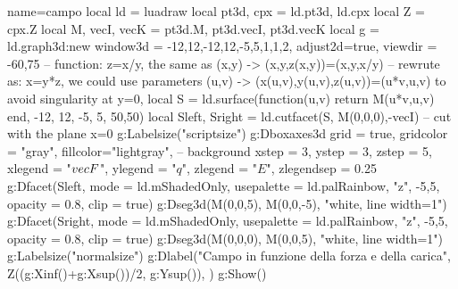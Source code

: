 \documentclass{standalone}
\begin{document}
    \begin{luadraw}{name=campo}
    local ld = luadraw
    local pt3d, cpx = ld.pt3d, ld.cpx
    local Z = cpx.Z
    local M, vecI, vecK = pt3d.M, pt3d.vecI, pt3d.vecK
    local g = ld.graph3d:new{
        window3d = {-12,12,-12,12,-5,5,1,1,2},
        adjust2d=true, viewdir = {-60,75}
    }
    -- function: z=x/y, the same as (x,y) -> (x,y,z(x,y))=(x,y,x/y) 
    -- rewrute as: x=y*z, we could use parameters (u,v) -> (x(u,v),y(u,v),z(u,v))=(u*v,u,v) to avoid singularity at y=0,
    local S = ld.surface(function(u,v) return M(u*v,u,v) end, -12, 12, -5, 5, {50,50})
    local Sleft, Sright = ld.cutfacet(S, {M(0,0,0),-vecI}) -- cut with the plane x=0
    g:Labelsize("scriptsize")
    g:Dboxaxes3d{
        grid = true, gridcolor = "gray", fillcolor="lightgray", -- background
        xstep = 3, ystep = 3, zstep = 5,
        xlegend = "$\\vec{F}$", ylegend = "$q$",
        zlegend = "$E$", zlegendsep = 0.25
    }
    g:Dfacet(Sleft, {mode = ld.mShadedOnly, usepalette = {ld.palRainbow, "z", {-5,5}}, opacity = 0.8, clip = true})
    g:Dseg3d({M(0,0,5), M(0,0,-5)}, "white, line width=1")
    g:Dfacet(Sright, {mode = ld.mShadedOnly, usepalette = {ld.palRainbow, "z", {-5,5}}, opacity = 0.8, clip = true})
    g:Dseg3d({M(0,0,0), M(0,0,5)}, "white, line width=1")
    g:Labelsize("normalsize")
    g:Dlabel("Campo in funzione della forza e della carica", Z((g:Xinf()+g:Xsup())/2, g:Ysup()), {})
    g:Show()
    \end{luadraw}
\end{document}
